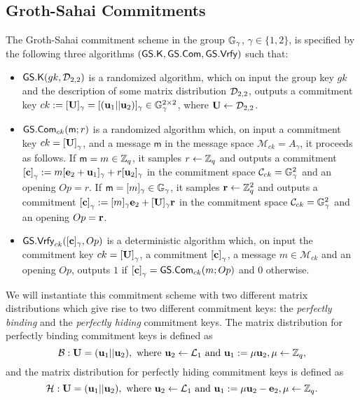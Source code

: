 \subsection{Groth-Sahai Commitments} \label{sec:gs-comms}
 
\begin{definition} The Groth-Sahai commitment scheme in the group $\mathbb{G}_\gamma$, $\gamma\in\{1,2\}$, is  specified by the following three algorithms 
	$(\mathsf{GS}.\mathsf{K},\mathsf{GS}.\mathsf{Com},\mathsf{GS}.\mathsf{Vrfy})$ such that:
	\begin{itemize} 
		\item  $\mathsf{GS}.\mathsf{K}(gk,\mathcal{D}_{2,2})$ is a randomized algorithm, which on input the group key $gk$ and the description of some matrix distribution $\mathcal{D}_{2,2}$, outputs a commitment key $ck:=[\mathbf{{U}}]_\gamma=[(\mathbf{u}_1||\mathbf{u}_2)]_\gamma \in\mathbb{G}_\gamma^{2\times 2}$, where $\mathbf{{U}}\gets\mathcal{D}_{2,2}$.
		\item $\mathsf{GS}.\mathsf{Com}_{ck}(\mathsf{m};r)$ is a randomized algorithm which, on input a commitment key $ck=\left[\mathbf{{U}}\right]_\gamma$, and a message 
		$\mathsf{m}$ in the message space $\mathcal{M}_{ck}=A_\gamma$, it proceeds as follows. If $\mathsf{m}=m\in\mathbb{Z}_q$, it samples $r \gets \mathbb{Z}_q$ and outputs a commitment $\left[\mathbf{c}\right]_\gamma := m[\mathbf{e}_2+\mathbf{u}_1]_\gamma+r[\mathbf{u}_2]_\gamma$ in the commitment space $\mathcal{C}_{ck}=\mathbb{G}_\gamma^2$ and an opening $Op=r$. If $\mathsf{m}=[m]_\gamma\in\mathbb{G}_\gamma$, it samples $\mathbf{r} \gets \mathbb{Z}_q^2$ and outputs a commitment $\left[\mathbf{c}\right]_\gamma := [m]_\gamma\mathbf{e}_2+[\mathbf{{U}}]_\gamma\mathbf{r}$ in the commitment space $\mathcal{C}_{ck}=\mathbb{G}_\gamma^2$ and an opening $Op=\mathbf{r}$.
		\item $\mathsf{GS}.\mathsf{Vrfy}_{ck}([\mathbf{c}]_\gamma,Op)$ is a deterministic algorithm which, on input the commitment key $ck=\left[\mathbf{{U}}\right]_\gamma$, a commitment $\left[\mathbf{c}\right]_\gamma$,  a message 
		$m \in \mathcal{M}_{ck}$ and an opening $Op$, outputs $1$ if $\left[\mathbf{c}\right]_\gamma={\mathsf{GS}}.\mathsf{Com}_{ck}(m;Op)$
		and $0$ otherwise.
	\end{itemize}
\end{definition}

We will instantiate this commitment scheme with two different matrix distributions which give rise to two different commitment keys: the \emph{perfectly binding} and the \emph{perfectly hiding} commitment keys. The matrix distribution for perfectly binding commitment keys is defined as
$$
\mathcal{B}:\mathbf{{U}}=(\mathbf{u}_1||\mathbf{u}_2),\text{ where }\mathbf{u}_2\gets\mathcal{L}_1\text{ and } \mathbf{u}_1 :=\mu\mathbf{u}_2, \mu\gets\mathbb{Z}_q,
$$
and the matrix distribution for perfectly hiding commitment keys is defined as
$$
\mathcal{H}:\mathbf{{U}}=(\mathbf{u}_1||\mathbf{u}_2),\text{ where } \mathbf{u}_2\gets\mathcal{L}_1\text{ and } \mathbf{u}_1 :=\mu\mathbf{u}_2-\mathbf{e}_2, \mu\gets\mathbb{Z}_q.
$$

